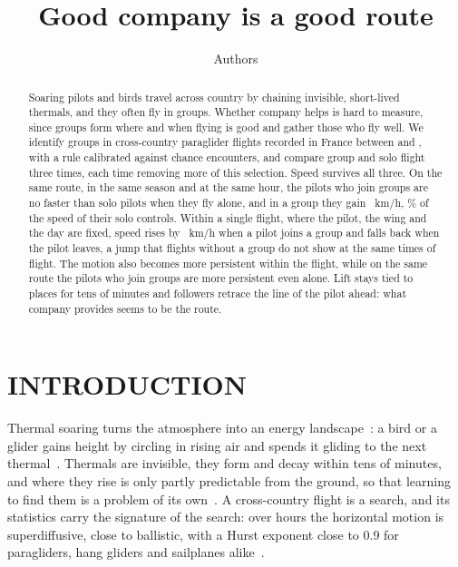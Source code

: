 \documentclass[aps,prl,twocolumn,superscriptaddress,nofootinbib]{revtex4-2}
\newcommand{\pending}[1]{\textcolor{red}{[#1]}}
\begin{document}
\title{Good company is a good route}

\author{Authors}
\affiliation{\pending{affiliation}}

\begin{abstract}
Soaring pilots and birds travel across country by chaining invisible, short-lived thermals, and
they often fly in groups. Whether company helps is hard to measure, since groups form where and
when flying is good and gather those who fly well. We identify groups in \LtFlights{}
cross-country paraglider flights recorded in France between \LtFirstYear{} and \LtLastYear{}, with
a rule calibrated against chance encounters, and compare group and solo flight three times, each
time removing more of this selection. Speed survives all three. On the same route, in the same
season and at the same hour, the pilots who join groups are no faster than solo pilots when they
fly alone, and in a group they gain \LtRouteXcDiff~km/h, \LtRouteXcDiffPct\% of the speed of their
solo controls. Within a single flight, where the pilot, the wing and the day are fixed, speed
rises by \LtFltMaxNetGXc~km/h when a pilot joins a group and falls back when the pilot leaves, a
jump that flights without a group do not show at the same times of flight. The motion also
becomes more persistent within the flight, while on the same route the pilots who join groups are
more persistent even alone. Lift stays tied to places for tens of minutes and followers retrace
the line of the pilot ahead: what company provides seems to be the route.
\end{abstract}

\maketitle


\section*{INTRODUCTION}

Thermal soaring turns the atmosphere into an energy landscape~\cite{Shepard2013}: a bird or a
glider gains height by circling in rising air and spends it gliding to the next
thermal~\cite{Akos2008,Keskin2025}. Thermals are invisible, they form and decay within tens of
minutes, and where they rise is only partly predictable from the ground, so that learning to
find them is a problem of its own~\cite{Reddy2016,Reddy2018}. A cross-country flight is a search,
and its statistics carry the signature of the search: over hours the horizontal motion is
superdiffusive, close to ballistic, with a Hurst exponent close to 0.9 for paragliders, hang
gliders and sailplanes alike~\cite{Vilpellet2026}.
\end{document}
